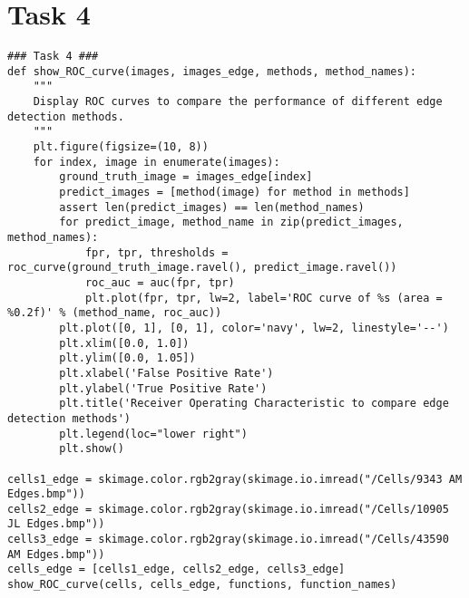 \documentclass[11pt]{article}
\begin{document}
\section*{Task 4}

\begin{lstlisting}
### Task 4 ###
def show_ROC_curve(images, images_edge, methods, method_names):
    """
    Display ROC curves to compare the performance of different edge detection methods.
    """
    plt.figure(figsize=(10, 8))
    for index, image in enumerate(images):
        ground_truth_image = images_edge[index]
        predict_images = [method(image) for method in methods]
        assert len(predict_images) == len(method_names)
        for predict_image, method_name in zip(predict_images, method_names):
            fpr, tpr, thresholds = roc_curve(ground_truth_image.ravel(), predict_image.ravel())
            roc_auc = auc(fpr, tpr)
            plt.plot(fpr, tpr, lw=2, label='ROC curve of %s (area = %0.2f)' % (method_name, roc_auc))
        plt.plot([0, 1], [0, 1], color='navy', lw=2, linestyle='--')
        plt.xlim([0.0, 1.0])
        plt.ylim([0.0, 1.05])
        plt.xlabel('False Positive Rate')
        plt.ylabel('True Positive Rate')
        plt.title('Receiver Operating Characteristic to compare edge detection methods')
        plt.legend(loc="lower right")
        plt.show()

cells1_edge = skimage.color.rgb2gray(skimage.io.imread("/Cells/9343 AM Edges.bmp"))
cells2_edge = skimage.color.rgb2gray(skimage.io.imread("/Cells/10905 JL Edges.bmp"))
cells3_edge = skimage.color.rgb2gray(skimage.io.imread("/Cells/43590 AM Edges.bmp"))
cells_edge = [cells1_edge, cells2_edge, cells3_edge]
show_ROC_curve(cells, cells_edge, functions, function_names)
\end{lstlisting} 
\end{document}
